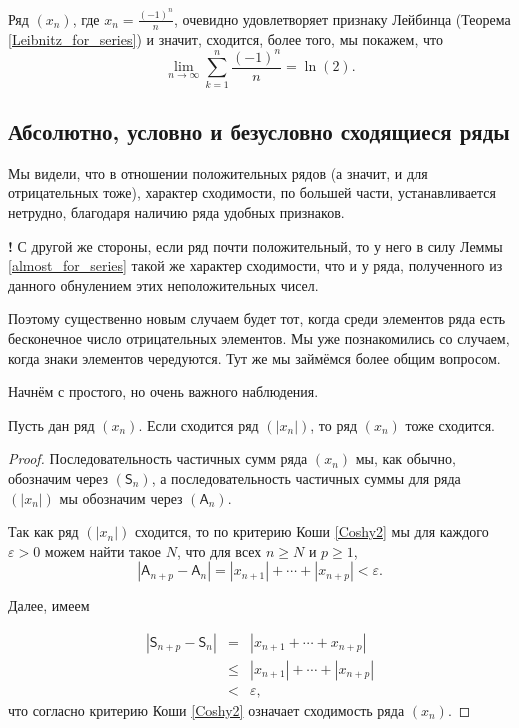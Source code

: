 \begin{example}
    Ряд $(x_n)$, где $x_n = \frac{(-1)^n}{n}$, очевидно удовлетворяет признаку Лейбинца (Теорема \ref{Leibnitz_for_series}) и значит, сходится, более того, мы покажем, что 
    \[
     \lim_{n \to \infty} \sum_{k=1}^n \frac{(-1)^n}{n} = \ln(2).
    \]
\end{example}


\subsection{Абсолютно, условно и безусловно сходящиеся ряды}

Мы видели, что в отношении положительных рядов (а значит, и для отрицательных тоже), характер сходимости, по большей части, устанавливается нетрудно, благодаря наличию ряда удобных признаков.

\begin{mydanger}{\bf{!}}
 С другой же стороны, если ряд почти положительный, то у него в силу Леммы \ref{almost_for_series} такой же характер сходимости, что и у ряда, полученного из данного обнулением этих неположительных чисел.    
\end{mydanger}

Поэтому существенно новым случаем будет тот, когда среди элементов ряда есть бесконечное число отрицательных элементов. Мы уже познакомились со случаем, когда знаки элементов чередуются. Тут же мы займёмся более общим вопросом. 

Начнём с простого, но очень важного наблюдения.

\begin{theorem}\label{abs=ok}
    Пусть дан ряд $(x_n)$. Если сходится ряд $(|x_n|)$, то ряд $(x_n)$ тоже сходится.
\end{theorem}

\begin{proof}
Последовательность частичных сумм ряда $(x_n)$ мы, как обычно, обозначим через $(\mathsf{S}_n)$, а последовательность частичных суммы для ряда $(|x_n|)$ мы обозначим через $(\mathsf{A}_n)$.

Так как ряд $(|x_n|)$ сходится, то по критерию Коши \ref{Coshy2} мы для каждого $\varepsilon >0$ можем найти такое $N$, что для всех $n \ge N$ и $p \ge 1$,  
\[
 | \mathsf{A}_{n+p} - \mathsf{A}_{n} | = |x_{n+1} | + \cdots +|x_{n+p}| < \varepsilon.
\]

Далее, имеем 

\begin{eqnarray*}
    \left|\mathsf{S}_{n+p} - \mathsf{S}_n \right| &=& | x_{n+1} + \cdots + x_{n+p} | \\
    &\le & |x_{n+1}| + \cdots + |x_{n+p}| \\
    &<& \varepsilon,
\end{eqnarray*}
что согласно критерию Коши \ref{Coshy2} означает сходимость ряда $(x_n).$ 
\end{proof}

